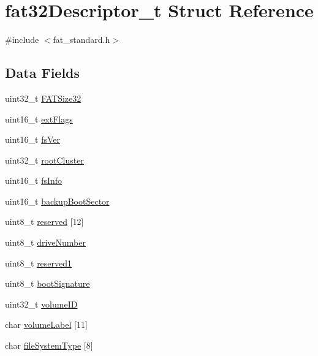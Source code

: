 \hypertarget{structfat32Descriptor__t}{\section{fat32\+Descriptor\+\_\+t Struct Reference}
\label{structfat32Descriptor__t}
}


{\ttfamily \#include $<$fat\+\_\+standard.\+h$>$}

\subsection*{Data Fields}
\begin{DoxyCompactItemize}
\item 
uint32\+\_\+t \hyperlink{structfat32Descriptor__t_ae09e1be459d9663a85f84d914c4c3ea6}{F\+A\+T\+Size32}
\item 
uint16\+\_\+t \hyperlink{structfat32Descriptor__t_a000c0a5a735580d02101626676dc7a4b}{ext\+Flags}
\item 
uint16\+\_\+t \hyperlink{structfat32Descriptor__t_aed1948457a037260716abfb98eae4749}{fs\+Ver}
\item 
uint32\+\_\+t \hyperlink{structfat32Descriptor__t_a13436c38d0bbf9d03619a8a3de5b5e39}{root\+Cluster}
\item 
uint16\+\_\+t \hyperlink{structfat32Descriptor__t_a18f90448b4918044a6eda694ce28261f}{fs\+Info}
\item 
uint16\+\_\+t \hyperlink{structfat32Descriptor__t_a22308a0574a8f5c92784598fa8625133}{backup\+Boot\+Sector}
\item 
uint8\+\_\+t \hyperlink{structfat32Descriptor__t_a6f7812c411ce6dc9eea5214875fcbd59}{reserved} \mbox{[}12\mbox{]}
\item 
uint8\+\_\+t \hyperlink{structfat32Descriptor__t_a061d69404ff51bb639e98ff259080a9e}{drive\+Number}
\item 
uint8\+\_\+t \hyperlink{structfat32Descriptor__t_acd9947c906ded6154e74f85b616e8d7f}{reserved1}
\item 
uint8\+\_\+t \hyperlink{structfat32Descriptor__t_ad284ac5f885eb73069a724c28e48b56a}{boot\+Signature}
\item 
uint32\+\_\+t \hyperlink{structfat32Descriptor__t_acd392981355aded3fd49218cb800169d}{volume\+I\+D}
\item 
char \hyperlink{structfat32Descriptor__t_a3fa99bc22dea35e9fddf03f5105923fa}{volume\+Label} \mbox{[}11\mbox{]}
\item 
char \hyperlink{structfat32Descriptor__t_a8e1cf8252871567c3c3eaaf8f6d97155}{file\+System\+Type} \mbox{[}8\mbox{]}
\end{DoxyCompactItemize}


